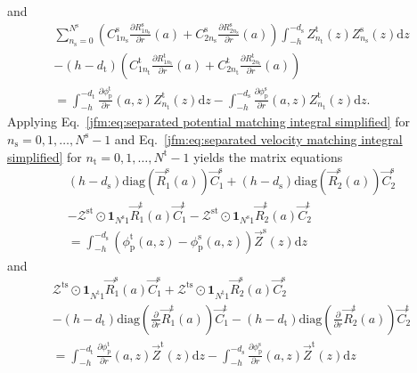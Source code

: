 and
\begin{multline}\label{jfm:eq:separated velocity matching integral simplified}
    \sum _{n_\mathrm{s} = 0}^{N^\mathrm{s}} \left(C^\mathrm{s}_{1n_\mathrm{s}} \frac{\partial R_{1n_\mathrm{s}}^\mathrm{s}}{\partial r}(a)+ C^\mathrm{s}_{2n_\mathrm{s}} \frac{\partial R_{2n_\mathrm{s}}^\mathrm{s}}{\partial r}(a) \right)\int_{-h}^{-d_\mathrm{s}} Z^\mathrm{t}_{n_\mathrm{t}}(z) Z_{n_\mathrm{s}}^\mathrm{s}(z)  \mathrm{d}z \\ - (h-d_\mathrm{t}) \left( C^\mathrm{t}_{1n_\mathrm{t}} \frac{\partial R_{1n_\mathrm{t}}^\mathrm{t}}{\partial r} (a)+ C^\mathrm{t}_{2n_\mathrm{t}} \frac{\partial R_{2n_\mathrm{t}}^\mathrm{t}}{\partial r}(a) \right) \\ = \int_{-h}^{-d_\mathrm{t}}\frac{\partial \phi_\mathrm{p}^\mathrm{t}}{\partial r}(a,z) Z^\mathrm{t}_{n_\mathrm{t}}(z) \mathrm{d}z-\int_{-h}^{-d_\mathrm{s}}\frac{\partial \phi_\mathrm{p}^\mathrm{s}}{\partial r}(a,z) Z^\mathrm{t}_{n_\mathrm{t}}(z) \mathrm{d}z.
\end{multline}
Applying Eq.~\ref{jfm:eq:separated potential matching integral simplified} for $n_\mathrm{s}=0,1,\dots, N^\mathrm{s}-1$ and Eq.~\ref{jfm:eq:separated velocity matching integral simplified} for $n_\mathrm{t}=0,1,\dots, N^\mathrm{t}-1$ yields the matrix equations
\begin{multline}\label{jfm:eq:potential matching vector equations}
    (h-d_\mathrm{s})\mathrm{diag}\left( \vec{R}_{1}^\mathrm{s}(a)\right) \vec{C}_{1}^\mathrm{s}  + (h-d_\mathrm{s})\mathrm{diag}\left(\vec{R}_{2}^\mathrm{s}(a)\right) \vec{C}_{2}^\mathrm{s} \\ - \boldsymbol{\mathcal{Z}}^{\mathrm{st}} \odot \boldsymbol{1}_{N^\mathrm{s}1}\vec{R}_{1}^\mathrm{t}(a)\vec{C}_1^\mathrm{t}  - \boldsymbol{\mathcal{Z}}^{\mathrm{st}} \odot \boldsymbol{1}_{N^\mathrm{s}1}\vec{R}_{2}^\mathrm{t}(a)\vec{C}_2^\mathrm{t} \\ =\int_{-h}^{-d_\mathrm{s}}\left( \phi_\mathrm{p}^\mathrm{t}(a,z) - \phi_\mathrm{p}^\mathrm{s}(a,z) \right) \vec{Z}^\mathrm{s}(z) \mathrm{d}z
\end{multline}
and
\begin{multline}\label{jfm:eq:velocity matching vector equations}
    \boldsymbol{\mathcal{Z}}^\mathrm{ts} \odot \mathbf{1}_{N^\mathrm{t}1}\vec{R}_1^\mathrm{s}(a)\vec{C}_1^\mathrm{s}+\boldsymbol{\mathcal{Z}}^\mathrm{ts} \odot \mathbf{1}_{N^\mathrm{t}1}\vec{R}_2^\mathrm{s}(a)\vec{C}_2^\mathrm{s}\\ -(h-d_\mathrm{t})\mathrm{diag}\left( \frac{\partial}{\partial r} \vec{R}_1^\mathrm{t}(a)\right)\vec{C}_1^\mathrm{t} -(h-d_\mathrm{t})\mathrm{diag}\left( \frac{\partial}{\partial r} \vec{R}_2^\mathrm{t}(a)\right)\vec{C}_2^\mathrm{t} \\ = \int_{-h}^{-d_\mathrm{t}}\frac{\partial \phi_\mathrm{p}^\mathrm{t}}{\partial r}(a,z) \vec{Z}^\mathrm{t}{}(z) \mathrm{d}z-\int_{-h}^{-d_\mathrm{s}}\frac{\partial \phi_\mathrm{p}^\mathrm{s}}{\partial r}(a,z) \vec{Z}^\mathrm{t}{}(z) \mathrm{d}z
\end{multline}

